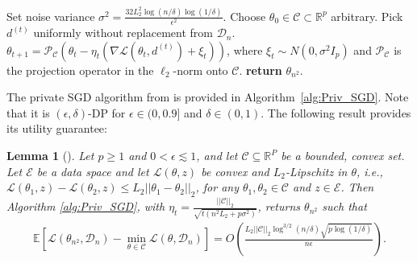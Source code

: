 \documentclass{article}
\newtheorem{lemma}{Lemma}
\begin{document}
\begin{algorithm}
\caption{$\mathcal{A}_{\text{Noise - GD}}$: Differentially Private SGD (General Bounded Convex
Case)}
\label{alg:Priv_SGD}
\begin{algorithmic}[1]
\State Set noise variance $\sigma^2 = \frac{32L_2^2\log(n/\delta)\log(1/\delta)}{\epsilon^2}$.
\State Choose $\theta_0 \in \mathcal{C} \subset \mathbb{R}^p$ arbitrary.
    \State Pick $d^{(t)}$ uniformly without replacement from $\mathcal{D}_n$.
        \State $\theta_{t + 1} = \mathcal{P}_{\mathcal{C}}\left(\theta_t - \eta_t\left(\nabla\mathcal{L}\left(\theta_t, d^{(t)}\right) + \xi_t\right)\right)$, where $\xi_t \sim N\left(0, \sigma^2I_p\right)$ and $\mathcal{P}_{\mathcal{C}}$ is the projection operator in the $\ell_2$-norm onto $\mathcal{C}$.
    \EndFor
    \State \textbf{return} $\theta_{n^2}$.
\EndFunction
\end{algorithmic}
\end{algorithm}

The private SGD algorithm from \cite{Bassily_SGD_l2} is provided in Algorithm~\ref{alg:Priv_SGD}. Note that it is $(\epsilon, \delta)$-DP for $\epsilon \in (0, 0.9]$ and $\delta \in (0, 1)$. The following result provides its utility guarantee:

\begin{lemma}[\cite{Bassily_SGD_l2}]\label{lemma:Util_Priv_SGD}
Let $p \geq 1$ and $0 < \epsilon \lesssim 1$, and let $\mathcal{C} \subseteq \mathbb{R}^P$ be a bounded, convex set. Let $\mathcal{E}$ be a data space and let $\mathcal{L}(\theta, z)$ be convex and $L_2$-Lipschitz in $\theta$, i.e., $\mathcal{L}(\theta_1, z) - \mathcal{L}(\theta_2, z)\leq L_2||\theta_1 - \theta_2||_2$, for any $\theta_1, \theta_2 \in \mathcal{C}$ and $z \in \mathcal{E}$. Then Algorithm \ref{alg:Priv_SGD}, with $\eta_t = \frac{||\mathcal{C}||_2}{\sqrt{t(n^2L_2 + p\sigma^2)}}$, returns $\theta_{n^2}$ such that
\begin{align*}
\mathbb{E}\left[\mathcal{L}(\theta_{n^2}, \mathcal{D}_n) - \mathop{\min}\limits_{\theta \in \mathcal{C}}\mathcal{L}(\theta, \mathcal{D}_n)\right] = O\left(\frac{L_2||\mathcal{C}||_2\log^{3/2}(n/\delta)\sqrt{p\log(1/\delta)}}{n\epsilon}\right).
\end{align*}
\end{lemma}
\end{document}
